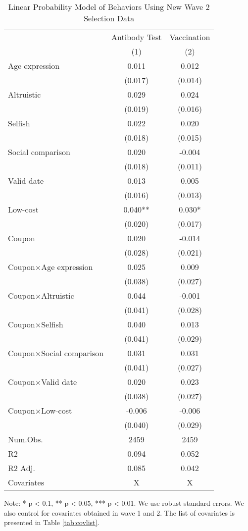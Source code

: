 \documentclass[
  11pt,
  a4paper,
]{article}
\begin{document}
\begin{table}

\caption{\label{tab:act2-reg}Linear Probability Model of Behaviors Using New Wave 2 Selection Data}
\centering
\begin{threeparttable}
\begin{tabular}[t]{lcc}
\toprule
\multicolumn{1}{c}{ } & \multicolumn{1}{c}{Antibody Test} & \multicolumn{1}{c}{Vaccination} \\
\cmidrule(l{3pt}r{3pt}){2-2} \cmidrule(l{3pt}r{3pt}){3-3}
  & (1) & (2)\\
\midrule
Age expression & 0.011 & 0.012\\
 & (0.017) & (0.014)\\
Altruistic & 0.029 & 0.024\\
 & (0.019) & (0.016)\\
Selfish & 0.022 & 0.020\\
 & (0.018) & (0.015)\\
Social comparison & 0.020 & -0.004\\
 & (0.018) & (0.011)\\
Valid date & 0.013 & 0.005\\
 & (0.016) & (0.013)\\
Low-cost & 0.040** & 0.030*\\
 & (0.020) & (0.017)\\
Coupon & 0.020 & -0.014\\
 & (0.028) & (0.021)\\
Coupon×Age expression & 0.025 & 0.009\\
 & (0.038) & \vphantom{1} (0.027)\\
Coupon×Altruistic & 0.044 & -0.001\\
 & (0.041) & (0.028)\\
Coupon×Selfish & 0.040 & 0.013\\
 & (0.041) & (0.029)\\
Coupon×Social comparison & 0.031 & 0.031\\
 & (0.041) & (0.027)\\
Coupon×Valid date & 0.020 & 0.023\\
 & (0.038) & (0.027)\\
Coupon×Low-cost & -0.006 & -0.006\\
 & (0.040) & (0.029)\\
\midrule
Num.Obs. & 2459 & 2459\\
R2 & 0.094 & 0.052\\
R2 Adj. & 0.085 & 0.042\\
Covariates & X & X\\
\bottomrule
\end{tabular}
\begin{tablenotes}
\item Note: * p < 0.1, ** p < 0.05, *** p < 0.01. We use robust standard errors. We also control for covariates obtained in wave 1 and 2. The list of covariates is presented in Table \ref{tab:covlist}.
\end{tablenotes}
\end{threeparttable}
\end{table}
\end{document}
